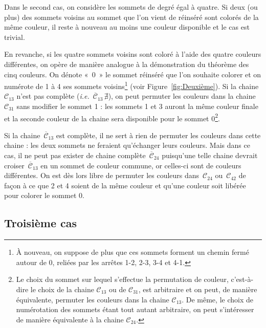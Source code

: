 Dans le second cas, on considère les sommets de degré égal à quatre. Si deux (ou plus) des sommets voisins au sommet que l'on vient de réinséré sont colorés de la même couleur, il reste à nouveau au moins une couleur disponible et le cas est trivial.

En revanche, si les quatre sommets voisins sont coloré à l'aide des quatre couleurs différentes, on opère de manière analogue à la démonstration du théorème des cinq couleurs. On dénote «~0~» le sommet réinséré que l'on souhaite colorer et on numérote de 1 à 4 ses sommets voisins\footnote{À nouveau, on suppose de plus que ces sommets forment un chemin fermé autour de 0, reliées par les arrêtes 1-2, 2-3, 3-4 et 4-1.} (voir Figure~\ref{fig:Deuxième}). Si la chaine $\mathcal{C}_{13}$ n'est pas complète (\textit{i.e.}~$\overline{\mathcal{C}}_{13}\,\nexists$), on peut permuter les couleurs dans la chaine $\mathcal{C}_{31}$ sans modifier le sommet 1 : les sommets 1 et 3 auront la même couleur finale et la seconde couleur de la chaine sera disponible pour le sommet 0\footnote{Le choix du sommet sur lequel s'effectue la permutation de couleur, c'est-à-dire le choix de la chaine $\mathcal{C}_{13}$ ou de $\mathcal{C}_{31}$, est arbitraire et on peut, de manière équivalente, permuter les couleurs dans la chaine $\mathcal{C}_{13}$. De même, le choix de numérotation des sommets étant tout autant arbitraire, on peut s'intéresser de manière équivalente à la chaine $\mathcal{C}_{24}$.}.

\begin{SCfigure}[][h!]
	
	\caption{Deuxième cas\\\footnotesize\textit{La chaine~$\overline{\mathcal{C}}_{13}$ existe-t-elle~?}}
	\label{fig:Deuxième}
\end{SCfigure}

Si la chaine~$\overline{\mathcal{C}}_{13}$ est complète, il ne sert à rien de permuter les couleurs dans cette chaine : les deux sommets ne feraient qu'échanger leurs couleurs. Mais dans ce cas, il ne peut pas exister de chaine complète~$\overline{\mathcal{C}}_{24}$ puisqu'une telle chaine devrait croiser~$\overline{\mathcal{C}}_{13}$ en un sommet de couleur commune, or celles-ci sont de couleurs différentes. On est dès lors libre de permuter les couleurs dans~$\mathcal{C}_{24}$ ou~$\mathcal{C}_{42}$ de façon à ce que 2 et 4 soient de la même couleur et qu'une couleur soit libérée pour colorer le sommet 0.

\subsection*{Troisième cas}

